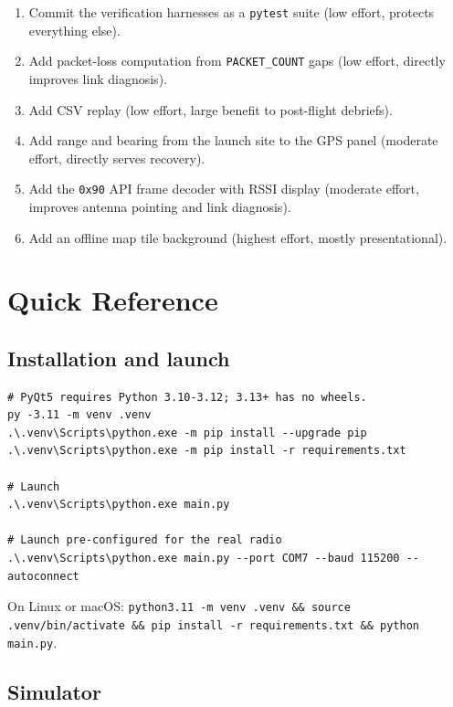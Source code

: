 \documentclass[11pt,a4paper]{article}
\newcommand{\code}[1]{\texttt{#1}}
\begin{document}
\begin{enumerate}
  \item Commit the verification harnesses as a \code{pytest} suite
        (low effort, protects everything else).
  \item Add packet-loss computation from \code{PACKET\_COUNT} gaps
        (low effort, directly improves link diagnosis).
  \item Add CSV replay (low effort, large benefit to post-flight debriefs).
  \item Add range and bearing from the launch site to the GPS panel
        (moderate effort, directly serves recovery).
  \item Add the \code{0x90} API frame decoder with RSSI display
        (moderate effort, improves antenna pointing and link diagnosis).
  \item Add an offline map tile background (highest effort, mostly
        presentational).
\end{enumerate}

\appendix
\section{Quick Reference}

\subsection{Installation and launch}

\begin{lstlisting}[style=gcsshell,caption={Environment setup and launch (Windows PowerShell).}]
# PyQt5 requires Python 3.10-3.12; 3.13+ has no wheels.
py -3.11 -m venv .venv
.\.venv\Scripts\python.exe -m pip install --upgrade pip
.\.venv\Scripts\python.exe -m pip install -r requirements.txt

# Launch
.\.venv\Scripts\python.exe main.py

# Launch pre-configured for the real radio
.\.venv\Scripts\python.exe main.py --port COM7 --baud 115200 --autoconnect
\end{lstlisting}

On Linux or macOS: \code{python3.11 -m venv .venv \&\& source
.venv/bin/activate \&\& pip install -r requirements.txt \&\& python main.py}.

\subsection{Simulator}
\label{sec:simulator}
\end{document}
